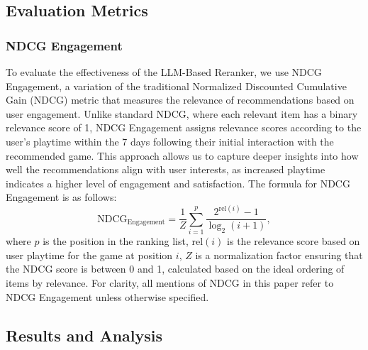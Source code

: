 \subsection{Evaluation Metrics}
\subsubsection{NDCG Engagement}
To evaluate the effectiveness of the LLM-Based Reranker, we use NDCG Engagement, a variation of the traditional Normalized Discounted Cumulative Gain (NDCG) metric that measures the relevance of recommendations based on user engagement. Unlike standard NDCG, where each relevant item has a binary relevance score of 1, NDCG Engagement assigns relevance scores according to the user’s playtime within the 7 days following their initial interaction with the recommended game. This approach allows us to capture deeper insights into how well the recommendations align with user interests, as increased playtime indicates a higher level of engagement and satisfaction. The formula for NDCG Engagement is as follows:
\[
\text{NDCG}_{\text{Engagement}} = \frac{1}{Z} \sum_{i=1}^{p} \frac{2^{\text{rel}(i)} - 1}{\log_2(i + 1)},
\]
where \( p \) is the position in the ranking list, \( \text{rel}(i) \) is the relevance score based on user playtime for the game at position \( i \), \( Z \) is a normalization factor ensuring that the NDCG score is between 0 and 1, calculated based on the ideal ordering of items by relevance. For clarity, all mentions of NDCG in this paper refer to NDCG Engagement unless otherwise specified. 


\subsection{Results and Analysis}
% 



